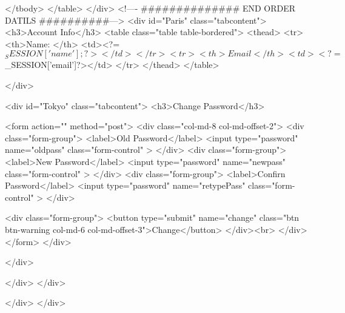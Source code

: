                                 </tbody>
                            </table>
</div>
<!---- ############## END ORDER DATILS ##########--->
<div id="Paris" class="tabcontent">
  <h3>Account Info</h3>
  <table class="table table-bordered">
      <thead>
         <tr>
            <th>Name: </th>
            <td><?= $_SESSION['name'];?></td>
         </tr>
         <tr>
             <th>Email</th>
             <td><?= $_SESSION['email']?></td>
         </tr>
      </thead>
  </table>
 
</div>

<div id="Tokyo" class="tabcontent">
  <h3>Change Password</h3>

  <form action="" method="post">
      <div class="col-md-8 col-md-offset-2">
          <div class="form-group">
              <label>Old Password</label>
              <input type="password" name="oldpass" class="form-control" >
          </div>
          <div class="form-group">
              <label>New Password</label>
              <input type="password" name="newpass" class="form-control" >
          </div>
          <div class="form-group">
              <label>Confirn Password</label>
              <input type="password" name="retypePass" class="form-control" >
          </div>
          
          <div class="form-group">
              <button type="submit" name="change" class="btn btn-warning col-md-6 col-md-offset-3">Change</button>
          </div><br>
      </div>
  </form>
</div>

</div>
            
          </div>
          </div>
      
      
    </div>
  </div>